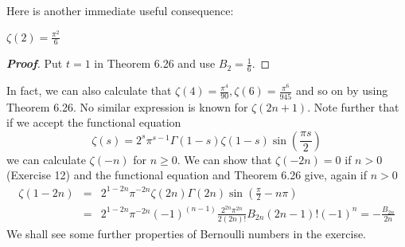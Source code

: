 Here is another immediate useful consequence:
\begin{corollary} $\zeta(2)=\frac{\pi^2}{6}$
\end{corollary}
\begin{proof}[\bf Proof] Put $t=1$ in Theorem 6.26 and use $B_2=\frac{1}{6}$.
\end{proof}
In fact, we can also calculate that $\zeta(4)=\frac{\pi^4}{90}, \zeta(6)=\frac{\pi^6}{945}$ and so on
by using Theorem 6.26. No similar expression is known for $\zeta(2n+1)$. Note further that if we accept
the functional equation
$$\zeta(s)=2^s \pi^{s-1}\Gamma(1-s)\zeta(1-s)\sin{(\frac{\pi s}{2})}$$
we can calculate $\zeta(-n)$ for $n \ge 0$. We can show that $\zeta(-2n)=0$ if $n>0$ (Exercise 12)
 and the functional equation and Theorem 6.26 give, again if $n>0$
\begin{eqnarray*}
\zeta(1-2n)&=&2^{1-2n}\pi^{-2n}\zeta(2n)\Gamma(2n)\sin{(\frac{\pi}{2}-n\pi)}\\
&=&2^{1-2n}\pi^{-2n}(-1)^{(n-1)}\frac{2^{2n}\pi^{2n}}{2(2n)!}B_{2n}(2n-1)!(-1)^n=-\frac{B_{2n}}{2n}
\end{eqnarray*}
We shall see some further properties of Bernoulli numbers in the exercise.




